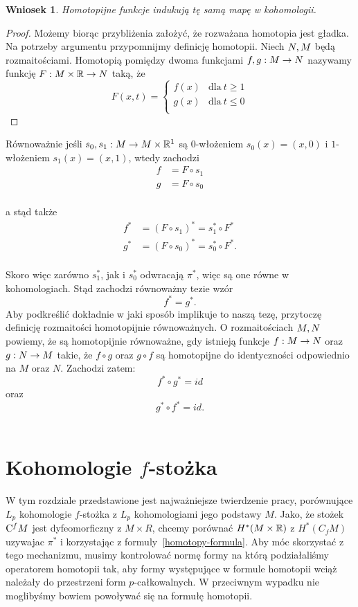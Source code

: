 \documentclass[licencjacka]{pracamgr}
\theoremstyle{definition}
\theoremstyle{definition}
\theoremstyle{plain}
\theoremstyle{plain}
\theoremstyle{plain}
\theoremstyle{plain}
\theoremstyle{plain}
\newtheorem{wniosek}{Wniosek}[section]
\def\cfm{\ensuremath\mathrm{C}^fM}
\def\M{\ensuremath M}
\def\N{\ensuremath N}
\def\R{\ensuremath\mathbb{R}}
\begin{document}
\begin{wniosek}
Homotopijne funkcje indukują tę samą mapę w kohomologii.
\end{wniosek}
\begin{proof}
Możemy biorąc przybliżenia założyć, że rozważana homotopia jest gładka.
Na potrzeby argumentu przypomnijmy definicję homotopii.  Niech $\N, \M$ będą
rozmaitościami.  Homotopią pomiędzy dwoma funkcjami $f,g: \M \rightarrow \N$
nazywamy funkcję $F: \M \times \R \rightarrow \N$ taką, że
\[
F(x,t) = 
\begin{cases}
f(x) & \text{dla}~t \geq 1 \\
g(x) & \text{dla}~t \leq 0 \\
\end{cases}
\]
\end{proof}
Równoważnie jeśli $s_0,s_1: \M \rightarrow  \M \times \R^1$ są $0$-włożeniem
$s_0(x) = (x, 0)$ i $1$-włożeniem $s_1(x) = (x,1)$, wtedy zachodzi
\begin{align*}
f &= F \circ s_1 \\
g &= F \circ s_0 \\
\end{align*}

a stąd także
\begin{align*}
f^\ast &= (F \circ s_1)^\ast = s_1^\ast \circ F^\ast \\
g^\ast &= (F \circ s_0)^\ast = s_0^\ast \circ F^\ast. \\
\end{align*}

Skoro więc zarówno $s_1^\ast$, jak i $s_0^\ast$ odwracają $\pi^\ast$, więc
są one równe w kohomologiach. Stąd zachodzi równoważny tezie wzór
\[
f^\ast = g^\ast.
\] 
Aby podkreślić dokładnie w jaki sposób implikuje to naszą tezę, przytoczę
definicję rozmaitości homotopijnie równoważnych. O rozmaitościach $\M, \N$
powiemy, że są homotopijnie równoważne, gdy istnieją funkcje
$f: \M \rightarrow \N$ oraz $g: \N \rightarrow \M$ takie, że
$f \circ g$ oraz $g \circ f$ są homotopijne do identyczności odpowiednio
na $M$ oraz $N$. Zachodzi zatem:
\[
f^\ast \circ g^\ast = id
\]
oraz 
\[
  g^\ast \circ f^\ast = id.
\] \\


\chapter{Kohomologie $f$-stożka}
W tym rozdziale przedstawione jest najważniejsze twierdzenie pracy, porównujące
$L_p$ kohomologie $f$-stożka z $L_p$ kohomologiami jego podstawy $M$.  Jako, że
stożek $\cfm$ jest dyfeomorficzny z $ M\times R$, chcemy porównać $H^*(M\times
\R)$ z $H^*(C_fM)$ uzywajac $\pi^*$ i korzystając z
formuly~\ref{homotopy-formula}.  Aby móc skorzystać z tego mechanizmu, musimy
kontrolować normę formy na którą podziałaliśmy operatorem homotopii tak, aby
formy występujące w formule homotopii wciąż należały do przestrzeni form
$p$-całkowalnych. W przeciwnym wypadku nie moglibyśmy bowiem powoływać się
na formułę homotopii. \\
\end{document}
